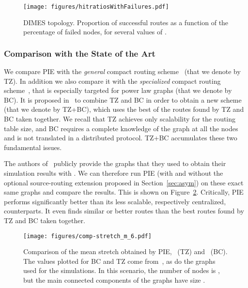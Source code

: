 \documentclass[conference]{IEEEtran}
\begin{document}
\begin{figure}
\centering
\texttt{[image: figures/hitratiosWithFailures.pdf]}\vspace{-1em}
\caption{DIMES topology. Proportion of successful routes as a function of the percentage of failed nodes, for several values of .}
\vspace{-1.3em}
\label{fig:failuresDimes}
\end{figure}

\subsubsection{Comparison with the State of the Art}
We compare PIE with the \emph{general} compact routing scheme~\cite{thorup:compact} (that we denote by TZ). In addition we also compare it with the \emph{specialized} compact routing scheme~\cite{brady}, that is especially targeted for power law graphs (that we denote by BC). It is proposed in~\cite{brady} to combine TZ and BC in order to obtain a new scheme (that we denote by TZ+BC), which uses the best of the routes found by TZ and BC taken together. We recall that TZ achieves only  scalability for the routing table size, and BC requires a complete knowledge of the graph at all the nodes and is not translated in a distributed protocol. TZ+BC accumulates these two fundamental issues.

The authors of~\cite{brady} publicly provide the graphs that they used to obtain their simulation results with .
We can therefore run PIE (with and without the optional source-routing extension proposed in Section~\ref{sec:asym}) on these exact same graphs and compare the results. This is shown on Figure~\ref{fig:comp}. Critically, PIE performs significantly better than its less scalable, respectively centralized, counterparts. It even finds similar or better routes than the best routes found by TZ and BC taken together.

\begin{figure}
\centering
\texttt{[image: figures/comp-stretch\_m\_6.pdf]}\vspace{-1em}
\caption{Comparison of the mean stretch obtained by PIE,~\cite{thorup:compact} (TZ) and~\cite{brady} (BC).
The values plotted for BC and TZ come from~\cite{brady}, as do the graphs used for the simulations. In this scenario, the number of nodes is , but the main connected components of the graphs have size .}
\vspace{-1.2em}
\label{fig:comp}
\end{figure}
\end{document}
